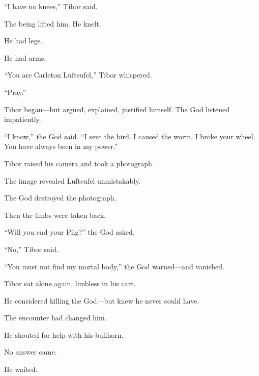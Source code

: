 “I have no knees,” Tibor said.

The being lifted him. He knelt.

He had legs.

He had arms.

“You are Carleton Lufteufel,” Tibor whispered.

“Pray.”

Tibor began—but argued, explained, justified himself. The God listened impatiently.

“I know,” the God said. “I sent the bird. I caused the worm. I broke your wheel. You have always been in my power.”

Tibor raised his camera and took a photograph.

The image revealed Lufteufel unmistakably.

The God destroyed the photograph.

Then the limbs were taken back.

“Will you end your Pilg?” the God asked.

“No,” Tibor said.

“You must not find my mortal body,” the God warned—and vanished.

Tibor sat alone again, limbless in his cart.

He considered killing the God—but knew he never could have.

The encounter had changed him.

He shouted for help with his bullhorn.

No answer came.

He waited.

